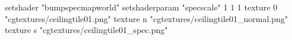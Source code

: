 setshader "bumpspecmapworld"
setshaderparam "specscale" 1 1 1
   texture 0 "cgtextures/ceilingtile01.png"
   texture n "cgtextures/ceilingtile01_normal.png"
   texture s "cgtextures/ceilingtile01_spec.png"